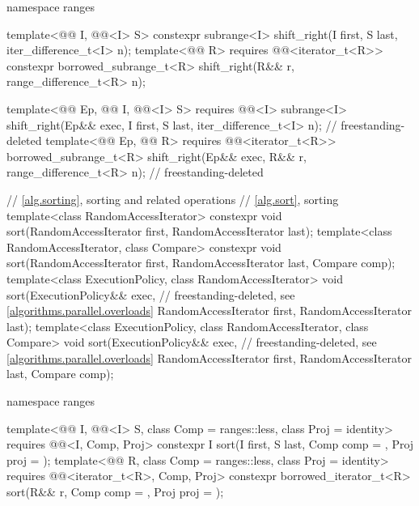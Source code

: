 \begin{codeblock}
{  namespace ranges {
    template<@@ I, @@<I> S>
      constexpr subrange<I> shift_right(I first, S last, iter_difference_t<I> n);
    template<@@ R>
      requires @@<iterator_t<R>>
      constexpr borrowed_subrange_t<R> shift_right(R&& r, range_difference_t<R> n);

    template<@@ Ep, @@ I, @@<I> S>
      requires @@<I>
      subrange<I>
        shift_right(Ep&& exec, I first, S last, iter_difference_t<I> n);    // freestanding-deleted
    template<@@ Ep, @@ R>
      requires @@<iterator_t<R>>
      borrowed_subrange_t<R>
        shift_right(Ep&& exec, R&& r, range_difference_t<R> n);             // freestanding-deleted
  }

  // \ref{alg.sorting}, sorting and related operations
  // \ref{alg.sort}, sorting
  template<class RandomAccessIterator>
    constexpr void sort(RandomAccessIterator first, RandomAccessIterator last);
  template<class RandomAccessIterator, class Compare>
    constexpr void sort(RandomAccessIterator first, RandomAccessIterator last,
                        Compare comp);
  template<class ExecutionPolicy, class RandomAccessIterator>
    void sort(ExecutionPolicy&& exec,                           // freestanding-deleted, see \ref{algorithms.parallel.overloads}
              RandomAccessIterator first, RandomAccessIterator last);
  template<class ExecutionPolicy, class RandomAccessIterator, class Compare>
    void sort(ExecutionPolicy&& exec,                           // freestanding-deleted, see \ref{algorithms.parallel.overloads}
              RandomAccessIterator first, RandomAccessIterator last,
              Compare comp);

  namespace ranges {
    template<@@ I, @@<I> S, class Comp = ranges::less,
             class Proj = identity>
      requires @@<I, Comp, Proj>
      constexpr I
        sort(I first, S last, Comp comp = {}, Proj proj = {});
    template<@@ R, class Comp = ranges::less, class Proj = identity>
      requires @@<iterator_t<R>, Comp, Proj>
      constexpr borrowed_iterator_t<R>
        sort(R&& r, Comp comp = {}, Proj proj = {});

}}
\end{codeblock}
